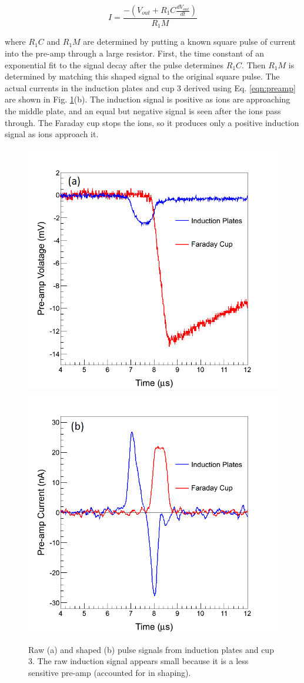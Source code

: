 \begin{equation}
I = \frac{-(V_{out} + R_{1} C \frac{dV_{out}}{dt})}{R_{1} M}
\label{eqn:preamp}
\end{equation}

\noindent
where $R_{1} C$ and $R_{1} M$ are determined by putting a known square pulse of current into the pre-amp through a large resistor.  First, the time constant of an exponential fit to the signal decay after the pulse determines $R_{1} C$.  Then $R_{1} M$ is determined by matching this shaped signal to the original square pulse.  The actual currents in the induction plates and cup 3 derived using Eq. \ref{eqn:preamp} are shown in Fig. \ref{fig:pulse_raw_shaped}(b).  The induction signal is positive as ions are approaching the middle plate, and an equal but negative signal is seen after the ions pass through.  The Faraday cup stops the ions, so it produces only a positive induction signal as ions approach it.

\begin{figure} %
                \includegraphics[width=.49\textwidth]{figures/pulse_ind_cup3_raw.png}
                \includegraphics[width=.49\textwidth]{figures/pulse_ind_cup3_shaped.png}
                \caption{Raw (a) and shaped (b) pulse signals from induction plates and cup 3.  The raw induction signal appears small because it is a less sensitive pre-amp (accounted for in shaping).}
        \label{fig:pulse_raw_shaped}
\end{figure}

